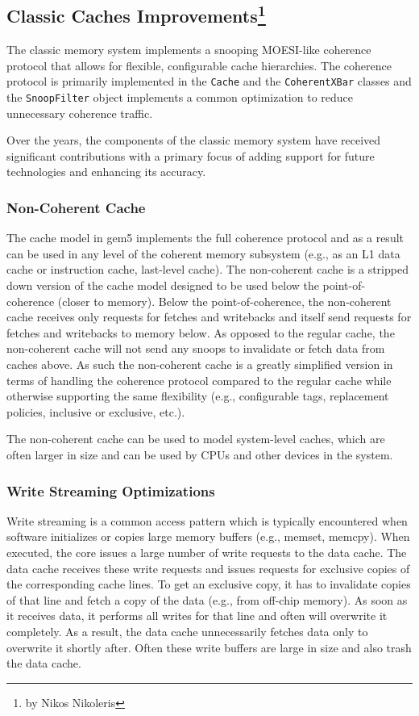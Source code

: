 \subsection[Classic Caches Improvements]{Classic Caches Improvements\footnote{by Nikos Nikoleris}}

The classic memory system implements a snooping MOESI-like coherence protocol that allows for flexible, configurable cache hierarchies.
The coherence protocol is primarily implemented in the \verb|Cache| and the \verb|CoherentXBar| classes and the \verb|SnoopFilter| object implements a common optimization to reduce unnecessary coherence traffic.

Over the years, the components of the classic memory system have received significant contributions with a primary focus of adding support for future technologies and enhancing its accuracy.

\subsubsection[Non-Coherent Cache]{Non-Coherent Cache}
The cache model in gem5 implements the full coherence protocol and as a result can be used in any level of the coherent memory subsystem (e.g., as an L1 data cache or instruction cache, last-level cache).
The non-coherent cache is a stripped down version of the cache model designed to be used below the point-of-coherence (closer to memory).
Below the point-of-coherence, the non-coherent cache receives only requests for fetches and writebacks and itself send requests for fetches and writebacks to memory below.
As opposed to the regular cache, the non-coherent cache will not send any snoops to invalidate or fetch data from caches above.
As such the non-coherent cache is a greatly simplified version in terms of handling the coherence protocol compared to the regular cache while otherwise supporting the same flexibility (e.g., configurable tags, replacement policies, inclusive or exclusive, etc.).

The non-coherent cache can be used to model system-level caches, which are often larger in size and can be used by CPUs and other devices in the system.

\subsubsection[Write Streaming Optimizations]{Write Streaming Optimizations}

Write streaming is a common access pattern which is typically encountered when software initializes or copies large memory buffers (e.g., memset, memcpy).
When executed, the core issues a large number of write requests to the data cache. The data cache receives these write requests and issues requests for exclusive copies of the corresponding cache lines. To get an exclusive copy, it has to invalidate copies of that line and fetch a copy of the data (e.g., from off-chip memory). As soon as it receives data, it performs all writes for that line and often will overwrite it completely. As a result, the data cache unnecessarily fetches data only to overwrite it shortly after. Often these write buffers are large in size and also trash the data cache.

